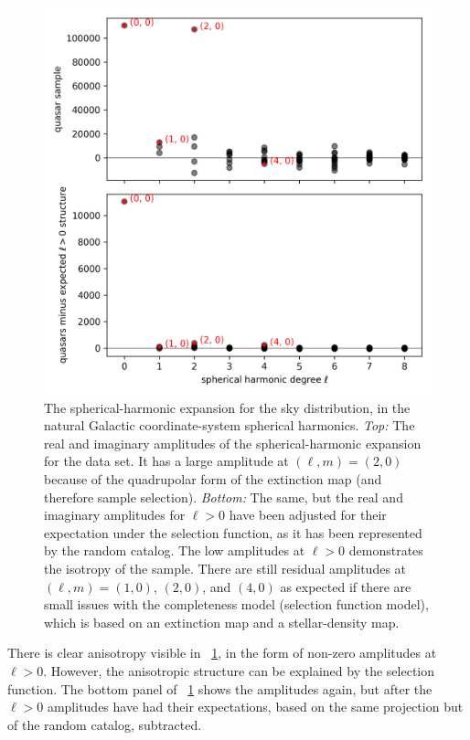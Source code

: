 \documentclass[modern]{aastex631}
\newlength{\figurewidth}
\newcommand{\figref}[1]{\figurename~\ref{#1}}
\begin{document}
\begin{figure}[t!]
  \begin{mdframed}
  \color{captiongray}
  \begin{center}
    \includegraphics[width=\figurewidth]{notebooks/alms.png}
  \end{center}
    \caption{The spherical-harmonic expansion for the sky distribution, in the natural Galactic coordinate-system spherical harmonics. \textsl{Top:} The real and imaginary amplitudes of the spherical-harmonic expansion for the data set. It has a large amplitude at $(\ell,m)=(2,0)$ because of the quadrupolar form of the extinction map (and therefore sample selection). \textsl{Bottom:} The same, but the real and imaginary amplitudes for $\ell>0$ have been adjusted for their expectation under the selection function, as it has been represented by the random catalog. The low amplitudes at $\ell>0$ demonstrates the isotropy of the sample. There are still residual amplitudes at $(\ell, m)=(1,0)$, $(2,0)$, and $(4,0)$ as expected if there are small issues with the completeness model (selection function model), which is based on an extinction map and a stellar-density map.\label{fig:alms}}
  \end{mdframed}
\end{figure}
There is clear anisotropy visible in \figref{fig:alms}, in the form of non-zero amplitudes at $\ell>0$.
However, the anisotropic structure can be explained by the selection function.
The bottom panel of \figref{fig:alms} shows the amplitudes again, but after the $\ell>0$ amplitudes have had their expectations, based on the same projection but of the random catalog, subtracted.
\end{document}
